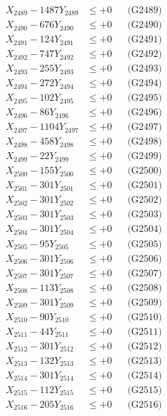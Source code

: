 \documentclass[a4paper,10pt]{article}
\begin{document}
{\begin{align}
X_{2489} - 1487Y_{2489} &\leq +0 && \text{(G2489)} \\
X_{2490} - 676Y_{2490} &\leq +0 && \text{(G2490)} \\
\allowbreak
X_{2491} - 124Y_{2491} &\leq +0 && \text{(G2491)} \\
X_{2492} - 747Y_{2492} &\leq +0 && \text{(G2492)} \\
X_{2493} - 255Y_{2493} &\leq +0 && \text{(G2493)} \\
X_{2494} - 272Y_{2494} &\leq +0 && \text{(G2494)} \\
X_{2495} - 102Y_{2495} &\leq +0 && \text{(G2495)} \\
X_{2496} - 86Y_{2496} &\leq +0 && \text{(G2496)} \\
X_{2497} - 1104Y_{2497} &\leq +0 && \text{(G2497)} \\
X_{2498} - 458Y_{2498} &\leq +0 && \text{(G2498)} \\
X_{2499} - 22Y_{2499} &\leq +0 && \text{(G2499)} \\
X_{2500} - 155Y_{2500} &\leq +0 && \text{(G2500)} \\
\allowbreak
X_{2501} - 301Y_{2501} &\leq +0 && \text{(G2501)} \\
X_{2502} - 301Y_{2502} &\leq +0 && \text{(G2502)} \\
X_{2503} - 301Y_{2503} &\leq +0 && \text{(G2503)} \\
X_{2504} - 301Y_{2504} &\leq +0 && \text{(G2504)} \\
X_{2505} - 95Y_{2505} &\leq +0 && \text{(G2505)} \\
X_{2506} - 301Y_{2506} &\leq +0 && \text{(G2506)} \\
X_{2507} - 301Y_{2507} &\leq +0 && \text{(G2507)} \\
X_{2508} - 113Y_{2508} &\leq +0 && \text{(G2508)} \\
X_{2509} - 301Y_{2509} &\leq +0 && \text{(G2509)} \\
X_{2510} - 90Y_{2510} &\leq +0 && \text{(G2510)} \\
\allowbreak
X_{2511} - 44Y_{2511} &\leq +0 && \text{(G2511)} \\
X_{2512} - 301Y_{2512} &\leq +0 && \text{(G2512)} \\
X_{2513} - 132Y_{2513} &\leq +0 && \text{(G2513)} \\
X_{2514} - 301Y_{2514} &\leq +0 && \text{(G2514)} \\
X_{2515} - 112Y_{2515} &\leq +0 && \text{(G2515)} \\
X_{2516} - 205Y_{2516} &\leq +0 && \text{(G2516)} \\

\end{align}}
\end{document}
